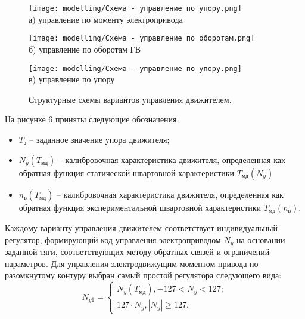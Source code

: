 \begin{figure}[ht]
    \begin{minipage}[b][][b]{\linewidth}\centering
        \texttt{[image: modelling/Схема - управление по упору.png]} \\ а) управление по моменту электропривода
    \end{minipage}
    \hfill
    \begin{minipage}[b][][b]{\linewidth}\centering
        \texttt{[image: modelling/Схема - управление по оборотам.png]} \\ б) управление по оборотам ГВ
    \end{minipage}
    \begin{minipage}[b][][b]{\linewidth}\centering
        \texttt{[image: modelling/Схема - управление по упору.png]} \\ в) управление по упору
    \end{minipage}
    \caption{Структурные схемы вариантов управления движителем.}
    \label{fig:control_methods_schemes}
\end{figure}

На рисунке 6 приняты следующие обозначения:  
\begin{itemize}
    \item $T_{\text{з}}$ -- заданное значение упора движителя;
    \item $N_y(T_{\text{мд}})$ -- калибровочная характеристика движителя, определенная как обратная функция статической швартовной характеристики $T_{\text{мд}}(N_y)$
    \item $n_{\text{в}}(T_{\text{мд}})$ -- калибровочная характеристика движителя, определенная как обратная функция экспериментальной швартовной характеристики $T_{\text{мд}}(n_{\text{в}})$.
\end{itemize}

Каждому варианту управления движителем соответствует индивидуальный регулятор, формирующий код управления электроприводом $N_y$ на основании заданной тяги, соответствующих методу обратных связей и ограничений параметров.
Для управления электродвижущим моментом привода по разомкнутому контуру выбран самый простой регулятора следующего вида:
\begin{equation}
    \label{eq:thruster_control_torque}
    N_{y1} = 
    \left\{
    \begin{array}{l}
        N_y(T_{\text{мд}}), -127 < N_y < 127; \\
        127 \cdot N_y, |N_y| \geq 127.
    \end{array}
    \right.
\end{equation}

